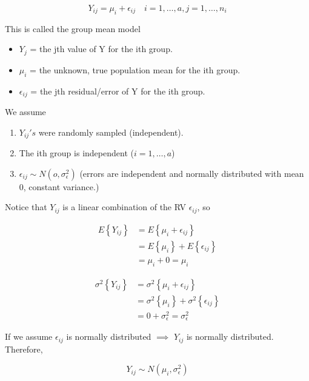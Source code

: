 \documentclass[10pt]{article}
\newcommand{\define}[1]{\colorbox{Thistle2}{#1}}
\newcommand{\mean}[1]{\mu_{#1}}
\renewcommand{\exp}[1]{E\left\{#1\right\}} %
\newcommand{\var}[1]{\sigma^2\left\{#1\right\}}
\newcommand{\sigvar}[1]{\sigma^2_{#1}} %
\newcommand{\err}[1]{\epsilon_{#1}}
\begin{document}
\begin{multicols}{3}
    \begin{equation*}
        Y_{ij} = \mean{i} + \err{ij} \quad i=1,\dots,a, j=1,\dots,n_i
    \end{equation*}

    This is called the \define{group mean model}

    \begin{itemize}
        \item $Y_{j}$ = the jth value of Y for the ith group.
        \item $\mean{i}$ = the unknown, true population mean for the ith group.
        \item $\err{ij}$ = the jth residual/error of Y for the ith group.
    \end{itemize}

    We assume
    \begin{enumerate}
        \item $Y_{ij}'s$ were randomly sampled (independent).
        \item The ith group is independent ($i=1,\dots,a$)
        \item $\err{ij} \sim N(o, \sigvar{\epsilon})$ (errors are independent and normally distributed with mean 0, constant variance.)
    \end{enumerate}

    Notice that $Y_{ij}$ is a linear combination of the RV $\err{ij}$, so

    \begin{align*}
        \exp{Y_{ij}} & = \exp{\mean{i} + \err{ij}} \\
                    & = \exp{\mean{i}} + \exp{\err{ij}} \\
                    & = \mean{i} + 0 = \mean{i}
    \end{align*}

    \begin{align*}
        \var{Y_{ij}} & = \var{\mean{i} + \err{ij}} \\
                & = \var{\mean{i}} + \var{\err{ij}} \\
                & = 0 + \sigvar{\epsilon} = \sigvar{\epsilon}
    \end{align*}

    If we assume $\err{ij}$ is normally distributed $\implies$ $Y_{ij}$ is normally distributed. Therefore, 

    \begin{equation*}
        Y_{ij} \sim N(\mean{i}, \sigvar{\epsilon})
    \end{equation*}


\end{multicols}
\end{document}
